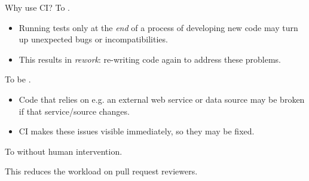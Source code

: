 \documentclass[12pt,aspectratio=169]{beamer}
\begin{document}
\begin{frame}{Why use CI?}
To .
\begin{itemize}
  \item Running tests only at the \emph{end} of a process of developing new code may turn up unexpected bugs or incompatibilities.
  \item This results in \emph{rework}: re-writing code again to address these problems.
\end{itemize}

\bigskip
To be .
 \begin{itemize}
   \item Code that relies on e.g. an external web service or data source may be broken if that service/source changes.
   \item CI makes these issues visible immediately, so they may be fixed.
 \end{itemize}

\bigskip
To  without human intervention.

\hspace{2em} This reduces the workload on pull request reviewers.

\end{frame}

\end{document}
